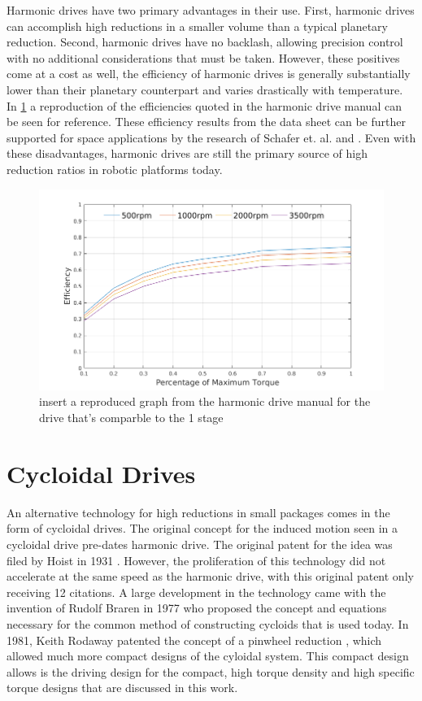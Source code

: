 Harmonic drives have two primary advantages in their use. First, harmonic drives can accomplish high reductions in a smaller volume than a typical planetary reduction. Second, harmonic drives have no backlash, allowing precision control with no additional considerations that must be taken. However, these positives come at a cost as well, the efficiency of harmonic drives is generally substantially lower than their planetary counterpart and varies drastically with temperature. In \ref{fig:harmonic_eff} a reproduction of the efficiencies quoted in the harmonic drive manual can be seen for reference. These efficiency results from the data sheet can be further supported for space applications by the research of Schafer et. al. \cite{ref:harmonic_space_lube} and \cite{ref:harmonic_performance}. Even with these disadvantages, harmonic drives are still the primary source of high reduction ratios in robotic platforms today. 

\begin{figure}[!b]
   \centering
   \includegraphics[width=0.7\linewidth]{fig/harmonic_eff}
   \caption{insert a reproduced graph from the harmonic drive manual for the drive that's comparble to the 1 stage }
   \label{fig:harmonic_eff}
\end{figure}

\section{Cycloidal Drives} \label{intro:cycloid}

An alternative technology for high reductions in small packages comes in the form of cycloidal drives. The original concept for the induced motion seen in a cycloidal drive pre-dates harmonic drive. The original patent for the idea was filed by Hoist in 1931 \cite{cycloid_original}. However, the proliferation of this technology did not accelerate at the same speed as the harmonic drive, with this original patent only receiving 12 citations. A large development in the technology came with the invention of Rudolf Braren in 1977 \cite{ref:cycloid_one_stage} who proposed the concept and equations necessary for the common method of constructing cycloids that is used today. In 1981, Keith Rodaway patented the concept of a pinwheel reduction \cite{ref:cycloid_pinwheel}, which allowed much more compact designs of the cyloidal system. This compact design allows is the driving design for the compact, high torque density and high specific torque designs that are discussed in this work.

